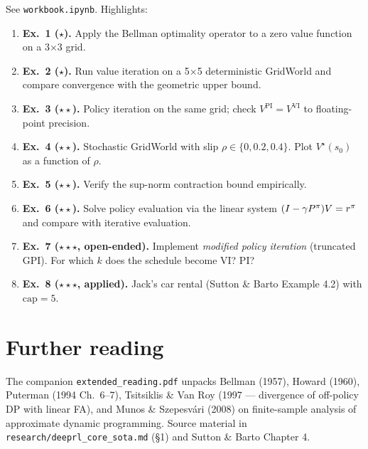 \documentclass[11pt,oneside]{scrbook}
\begin{document}
See \texttt{workbook.ipynb}. Highlights:
\begin{enumerate}[label={},leftmargin=0pt,labelsep=0pt]\setlength\itemsep{2pt}
  \item \textbf{Ex.\ 1 ($\star$).} Apply the Bellman optimality operator to a
        zero value function on a 3$\times$3 grid.
  \item \textbf{Ex.\ 2 ($\star$).} Run value iteration on a 5$\times$5
        deterministic GridWorld and compare convergence with the geometric upper bound.
  \item \textbf{Ex.\ 3 ($\star\star$).} Policy iteration on the same grid;
        check $V^{\text{PI}} = V^{\text{VI}}$ to floating-point precision.
  \item \textbf{Ex.\ 4 ($\star\star$).} Stochastic GridWorld with slip
        $\rho\in\{0,0.2,0.4\}$. Plot $V^\star(s_0)$ as a function of $\rho$.
  \item \textbf{Ex.\ 5 ($\star\star$).} Verify the sup-norm contraction
        bound empirically.
  \item \textbf{Ex.\ 6 ($\star\star$).} Solve policy evaluation via the
        linear system $(I-\gamma P^\pi)V = r^\pi$ and compare with
        iterative evaluation.
  \item \textbf{Ex.\ 7 ($\star\star\star$, open-ended).} Implement
        \emph{modified policy iteration} (truncated GPI). For which
        $k$ does the schedule become VI? PI?
  \item \textbf{Ex.\ 8 ($\star\star\star$, applied).} Jack's car rental
        (Sutton \& Barto Example 4.2) with $\text{cap}=5$.
\end{enumerate}

\chapter{Further reading}

The companion \texttt{extended\_reading.pdf} unpacks Bellman (1957),
Howard (1960), Puterman (1994 Ch.\ 6--7), Tsitsiklis \& Van Roy (1997 ---
divergence of off-policy DP with linear FA), and Munos \& Szepesv\'ari (2008)
on finite-sample analysis of approximate dynamic programming. Source
material in \verb|research/deeprl_core_sota.md| (\S 1) and Sutton \& Barto
Chapter 4.
\end{document}
